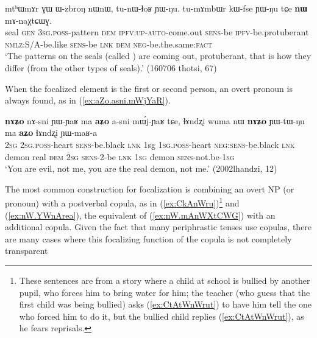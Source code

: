 \documentclass[oneside,a4paper,11pt]{article}
\newcommand{\ipa}[1]{{\phon{#1}}}
\begin{document}
\begin{exe}
\ex \label{ex:nW.mAnWXtCWG}
\gll mtʰɯmɤr ɣɯ ɯ-zbroŋ nɯnɯ, tu-nɯ-ɬoʁ ɲɯ-ŋu.  tu-mɤmbɯr kɯ-fse ɲɯ-ŋu tɕe \textbf{nɯ} mɤ-naχtɕɯɣ. \\
seal \textsc{gen} \textsc{3sg}.\textsc{poss}-pattern \textsc{dem} \textsc{ipfv}:\textsc{up}-\textsc{auto}-come.out \textsc{sens}-be \textsc{ipfv}-be.protuberant \textsc{nmlz}:S/A-be.like \textsc{sens}-be \textsc{lnk} \textsc{dem} \textsc{neg}-be.the.same:\textsc{fact} \\
\glt `The patterns on the seals (called \ipa{mtʰɯmɤr}) are coming out, protuberant, that is how they differ (from the other types of seals).' (160706 thotsi, 67)
\end{exe}

When the focalized element is the first or second person, an overt pronoun is always found, as in (\ref{ex:aZo.asni.mWjYaR}).

\begin{exe}
\ex \label{ex:aZo.asni.mWjYaR}
\gll \textbf{nɤʑo} nɤ-sni ɲɯ-ɲaʁ ma \textbf{aʑo} a-sni mɯ́j-ɲaʁ tɕe, ɬɤndʐi wuma nɯ \textbf{nɤʑo} ɲɯ-tɯ-ŋu ma \textbf{aʑo} ɬɤndʐi ɲɯ-maʁ-a \\
\textsc{2sg} \textsc{2sg}.\textsc{poss}-heart \textsc{sens}-be.black \textsc{lnk} 1sg \textsc{1sg}.\textsc{poss}-heart  \textsc{neg}:\textsc{sens}-be.black \textsc{lnk} demon real \textsc{dem} \textsc{2sg} \textsc{sens}-2-be \textsc{lnk} \textsc{1sg} demon \textsc{sens}-not.be-\textsc{1sg} \\
\glt `You are evil, not me, you are the real demon, not me.' (2002lhandzi, 12)
\end{exe}

The most common construction for focalization is combining an overt NP (or pronoun) with a postverbal copula, as in (\ref{ex:CkAnWru})\footnote{These sentences are from a story where a child at school is bullied by another pupil, who forces him to bring water for him; the teacher (who guess that the first child was being bullied) asks (\ref{ex:CtAtWnWrut}) to have him tell the one who forced him to do it, but the bullied child replies (\ref{ex:CtAtWnWrut}), as he fears reprisals.   } and (\ref{ex:nW.YWnArea}), the equivalent of (\ref{ex:nW.mAnWXtCWG}) with an additional copula. Given the fact that many periphrastic tenses use copulas, there are many cases where this focalizing function of the copula is not completely transparent 
\end{document}
